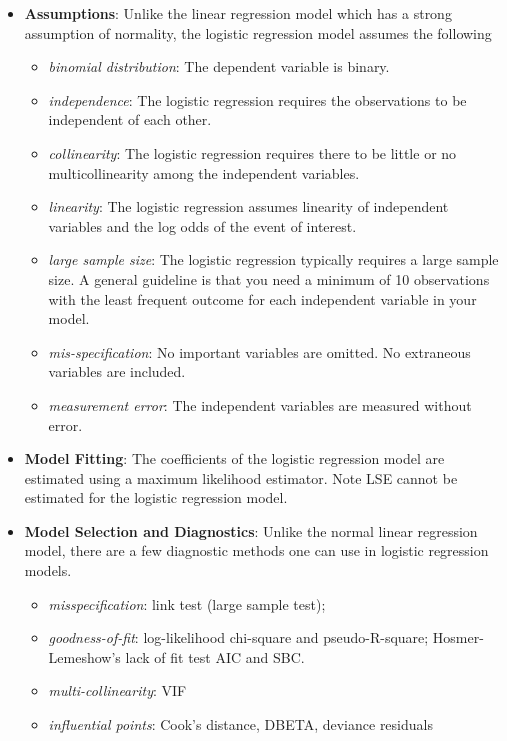 \documentclass[
]{book}
\providecommand{\tightlist}{%
  \setlength{\itemsep}{0pt}\setlength{\parskip}{0pt}}
\begin{document}
\begin{itemize}
\item
  \textbf{Assumptions}: Unlike the linear regression model which has a strong assumption of normality, the logistic regression model assumes the following

  \begin{itemize}
  \tightlist
  \item
    \emph{binomial distribution}: The dependent variable is binary.
  \item
    \emph{independence}: The logistic regression requires the observations to be independent of each other.
  \item
    \emph{collinearity}: The logistic regression requires there to be little or no multicollinearity among the independent variables.
  \item
    \emph{linearity}: The logistic regression assumes linearity of independent variables and the log odds of the event of interest.
  \item
    \emph{large sample size}: The logistic regression typically requires a large sample size. A general guideline is that you need a minimum of 10 observations with the least frequent outcome for each independent variable in your model.
  \item
    \emph{mis-specification}: No important variables are omitted. No extraneous variables are included.
  \item
    \emph{measurement error}: The independent variables are measured without error.
  \end{itemize}
\item
  \textbf{Model Fitting}: The coefficients of the logistic regression model are estimated using a maximum likelihood estimator. Note LSE cannot be estimated for the logistic regression model.
\item
  \textbf{Model Selection and Diagnostics}: Unlike the normal linear regression model, there are a few diagnostic methods one can use in logistic regression models.

  \begin{itemize}
  \tightlist
  \item
    \emph{misspecification}: link test (large sample test);
  \item
    \emph{goodness-of-fit}: log-likelihood chi-square and pseudo-R-square; Hosmer-Lemeshow's lack of fit test AIC and SBC.
  \item
    \emph{multi-collinearity}: VIF
  \item
    \emph{influential points}: Cook's distance, DBETA, deviance residuals
  \end{itemize}
\end{itemize}
\end{document}
